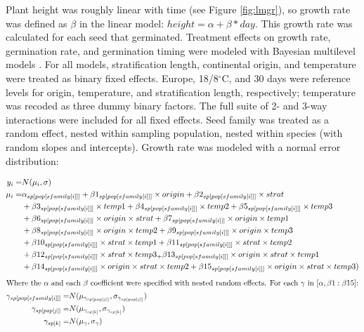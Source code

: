\documentclass[12pt]{article}\usepackage[]{graphicx}\usepackage[]{color}
\begin{document}
	Plant height was roughly linear with time (see Figure \ref{fig:lmgr}), so growth rate was defined as $\beta$ in the linear model: $height = \alpha + \beta*day $. This growth rate was calculated for each seed that germinated. Treatment effects on growth rate, germination rate, and germination timing were modeled with Bayesian multilevel models \parencite{Gelman2004}. For all models, stratification length, continental origin, and temperature were treated as binary fixed effects. Europe, 18/8$^\circ$C, and 30 days were reference levels for origin, temperature, and stratification length, respectively; temperature was recoded as three dummy binary factors. The full suite of 2- and 3-way interactions were included for all fixed effects. Seed family was treated as a random effect, nested within sampling population, nested within species (with random slopes and intercepts). Growth rate was modeled with a normal error distribution: 

\begin{align}
y_i =&  N(\mu_i,\sigma)\\
  \mu_i =&  \alpha_{sp[pop[sfamily[i]]]} + \beta 1_{sp[pop[sfamily[i]]]}\times origin +  \beta 2_{sp[pop[sfamily[i]]]} \times strat\\
          & +\beta 3_{sp[pop[sfamily[i]]]}\times temp1 +  \beta 4_{sp[pop[sfamily[i]]]}\times temp2 + \beta 5_{sp[pop[sfamily[i]]]}\times temp3 \notag \\
          & 
 		 + \beta 6_{sp[pop[sfamily[i]]]}\times origin\times strat  + \beta 7_{sp[pop[sfamily[i]]]}\times origin \times temp1 \notag\\ &
 		 + \beta 8_{sp[pop[sfamily[i]]]}\times origin \times temp2 + \beta 9_{sp[pop[sfamily[i]]]}\times origin \times temp3 \notag \\ &
 		 +\beta 10_{sp[pop[sfamily[i]]]}\times strat\times temp1 +\beta 11_{sp[pop[sfamily[i]]]}\times strat \times temp2 \notag \\ &
 		 + \beta 12_{sp[pop[sfamily[i]]]}\times strat \times temp3_ + \beta 13_{sp[pop[sfamily[i]]]}\times origin \times strat \times temp1 \notag\\ &
 		 +\beta 14_{sp[pop[sfamily[i]]]}\times origin \times strat \times temp2 + \beta 15_{sp[pop[sfamily[i]]]}\times origin \times strat \times temp3 )\notag
 \end{align}
 \begin{align}
 		 \intertext{Where the $\alpha$ and each $\beta$ coefficient were specified with nested random effects. For each $\gamma$ in $[\alpha,\beta 1:\beta 15]$:}
 		 \gamma_{sp[pop[sfamily[i]]]} =& N(\mu_{\gamma_{sp[pop[j]]}}, \sigma_{\gamma_{sp[pop[j]]}}) \\
 		 \gamma_{sp[pop[j]]} = & N(\mu_{\gamma_{sp[k]}}, \sigma_{\gamma_{sp[k]}}) \\
 		 \gamma_{sp[k]} = & N(\mu_{\gamma}, \sigma_{\gamma})
\end{align}
\end{document}

